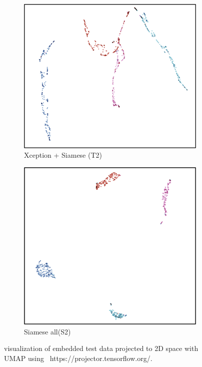 \begin{figure}[h]
  \centering
  \begin{subfigure}[b]{0.48\linewidth}
  \includegraphics[width=\linewidth]{figs/umab_visualT2.png}
  \caption{Xception + Siamese (T2)}
  \label{fig:con_loss}
  \end{subfigure}
  \hfill
   \begin{subfigure}[b]{0.48\linewidth}
   \includegraphics[width=\linewidth]{figs/umab_visualS2.png}
   \caption{Siamese all(S2)}
   \label{fig:tri_loss}
  \end{subfigure}
    \hfill
    \caption{visualization of embedded test data projected to 2D space with UMAP using  https://projector.tensorflow.org/.}
    \label{fig:2Dprojection}
\end{figure}


